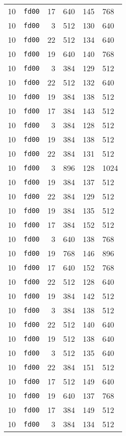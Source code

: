\documentclass{article}
\begin{document}
\begin{table}[h!]
\begin{tabular}{llrrrl}
    10 & \texttt{fd00} & 17 & 640 & 145 & 768 \\
    10 & \texttt{fd00} & 3 & 512 & 130 & 640 \\
    10 & \texttt{fd00} & 22 & 512 & 134 & 640 \\
    10 & \texttt{fd00} & 19 & 640 & 140 & 768 \\
    10 & \texttt{fd00} & 3 & 384 & 129 & 512 \\
    10 & \texttt{fd00} & 22 & 512 & 132 & 640 \\
    10 & \texttt{fd00} & 19 & 384 & 138 & 512 \\
    10 & \texttt{fd00} & 17 & 384 & 143 & 512 \\
    10 & \texttt{fd00} & 3 & 384 & 128 & 512 \\
    10 & \texttt{fd00} & 19 & 384 & 138 & 512 \\
    10 & \texttt{fd00} & 22 & 384 & 131 & 512 \\
    10 & \texttt{fd00} & 3 & 896 & 128 & 1024 \\
    10 & \texttt{fd00} & 19 & 384 & 137 & 512 \\
    10 & \texttt{fd00} & 22 & 384 & 129 & 512 \\
    10 & \texttt{fd00} & 19 & 384 & 135 & 512 \\
    10 & \texttt{fd00} & 17 & 384 & 152 & 512 \\
    10 & \texttt{fd00} & 3 & 640 & 138 & 768 \\
    10 & \texttt{fd00} & 19 & 768 & 146 & 896 \\
    10 & \texttt{fd00} & 17 & 640 & 152 & 768 \\
    10 & \texttt{fd00} & 22 & 512 & 128 & 640 \\
    10 & \texttt{fd00} & 19 & 384 & 142 & 512 \\
    10 & \texttt{fd00} & 3 & 384 & 138 & 512 \\
    10 & \texttt{fd00} & 22 & 512 & 140 & 640 \\
    10 & \texttt{fd00} & 19 & 512 & 138 & 640 \\
    10 & \texttt{fd00} & 3 & 512 & 135 & 640 \\
    10 & \texttt{fd00} & 22 & 384 & 151 & 512 \\
    10 & \texttt{fd00} & 17 & 512 & 149 & 640 \\
    10 & \texttt{fd00} & 19 & 640 & 137 & 768 \\
    10 & \texttt{fd00} & 17 & 384 & 149 & 512 \\
    10 & \texttt{fd00} & 3 & 384 & 134 & 512 \\

\end{tabular}
\end{table}
\end{document}
